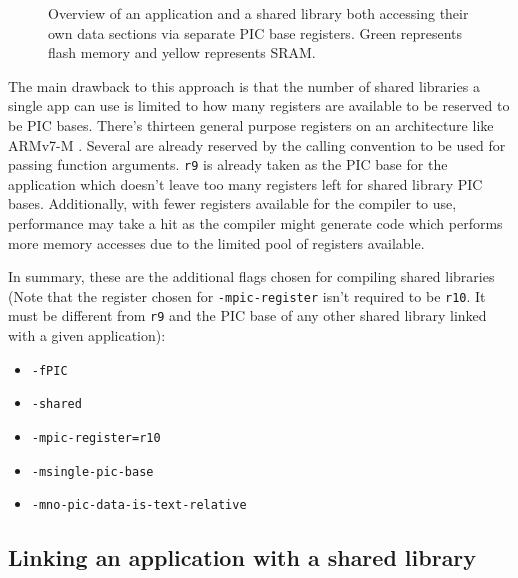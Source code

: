 \documentclass[12pt]{ucsddissertation}
\begin{document}
\begin{figure}[h]
    \centering
    
    \caption[Separate Application and Shared Library PIC Base Register]{Overview of an application and a shared library both accessing their own data sections via separate PIC base registers. Green represents flash memory and yellow represents SRAM.}
    \label{fig:r9r10}
\end{figure}

The main drawback to this approach is that the number of shared libraries a single app can use is limited to how many registers are available to be reserved to be PIC bases. There's thirteen general purpose registers on an architecture like ARMv7-M \cite{arm-spec}. Several are already reserved by the calling convention to be used for passing function arguments. \texttt{r9} is already taken as the PIC base for the application which doesn't leave too many registers left for shared library PIC bases. Additionally, with fewer registers available for the compiler to use, performance may take a hit as the compiler might generate code which performs more memory accesses due to the limited pool of registers available. 

In summary, these are the additional flags chosen for compiling shared libraries (Note that the register chosen for \texttt{-mpic-register} isn't required to be \texttt{r10}. It must be different from \texttt{r9} and the PIC base of any other shared library linked with a given application):

    \begin{itemize}
        \item \texttt{-fPIC }
        \item \texttt{-shared }
        \item \texttt{-mpic-register=r10 }
        \item \texttt{-msingle-pic-base}
        \item \texttt{-mno-pic-data-is-text-relative}
    \end{itemize}


\subsection{Linking an application with a shared library}
\end{document}
